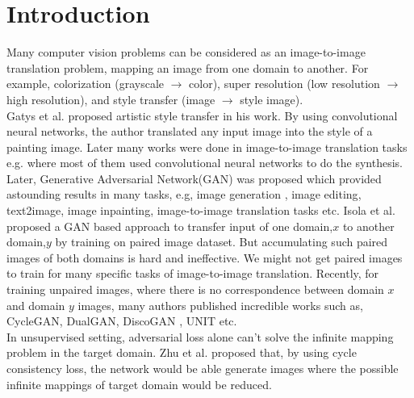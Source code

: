 \chapter{Introduction}
Many computer vision problems can be considered as an image-to-image translation problem, mapping an image from one domain to another. For example, colorization \cite{DBLP:journals/corr/LarssonMS16} \cite{DBLP:journals/corr/ZhangIE16} (grayscale $\rightarrow$ color), super resolution \cite{DBLP:journals/corr/LedigTHCATTWS16} \cite{DBLP:journals/corr/LaiHA017} (low resolution $\rightarrow$ high resolution), and style transfer \cite{DBLP:journals/corr/GatysEB15a} \cite{DBLP:journals/corr/LiW16} \cite{DBLP:journals/corr/LiaoYYHK17} (image $\rightarrow$ style image). \\
Gatys et al.\cite{DBLP:journals/corr/GatysEB15a} proposed artistic style transfer in his work. By using convolutional neural networks, the author translated any input image into the style of a painting image. Later many works were done in image-to-image translation tasks e.g.\cite{DBLP:journals/corr/LiW16} \cite{DBLP:journals/corr/LiaoYYHK17} where most of them used convolutional neural networks to do the synthesis.\\
Later, Generative Adversarial Network(GAN)\cite{goodfellow2014generative} was proposed which provided astounding results in many tasks, e.g, image generation \cite{DBLP:journals/corr/RadfordMC15} \cite{DBLP:journals/corr/DentonCSF15}, image editing\cite{DBLP:journals/corr/ZhuKSE16}, text2image\cite{DBLP:journals/corr/ZhangXLZHWM16}, image inpainting\cite{DBLP:journals/corr/PathakKDDE16}, image-to-image translation tasks\cite{cyclegan} \cite{pix2pix} etc. Isola et al.\cite{pix2pix} proposed a GAN based approach to transfer input of one domain,$x$ to another domain,$y$ by training on paired image dataset. But accumulating such paired images of both domains is hard and ineffective. We might not get paired images to train for many specific tasks of image-to-image translation. Recently, for training unpaired images, where there is no correspondence between domain $x$ and domain $y$ images, many authors published incredible works such as, CycleGAN\cite{cyclegan}, DualGAN\cite{DBLP:journals/corr/YiZTG17}, DiscoGAN \cite{DBLP:journals/corr/KimCKLK17}, UNIT\cite{DBLP:journals/corr/LiuBK17} etc.\\ 
In unsupervised setting, adversarial loss alone can't solve the infinite mapping problem in the target domain. Zhu et al.\cite{cyclegan} proposed that, by using cycle consistency loss, the network would be able generate images where the possible infinite mappings of target domain would be reduced.\\
